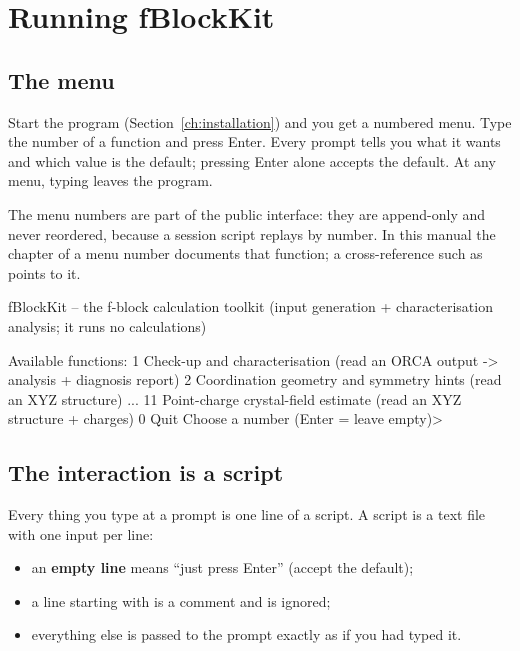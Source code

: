 \chapter{Running fBlockKit}
\label{ch:running}

\section{The menu}

Start the program (Section~\ref{ch:installation}) and you get a numbered menu.
Type the number of a function and press Enter. Every prompt tells you what it
wants and which value is the default; pressing Enter alone accepts the default.
At any menu, typing  leaves the program.

The menu numbers are part of the public interface: they are append-only and
never reordered, because a session script replays by number. In this manual the
chapter of a menu number documents that function; a cross-reference such as
 points to it.

\begin{transcript}[title={The program starts with its menu (excerpt)}]
fBlockKit -- the f-block calculation toolkit (input generation + characterisation analysis; it runs no calculations)

Available functions:
   1  Check-up and characterisation (read an ORCA output -> analysis + diagnosis report)
   2  Coordination geometry and symmetry hints (read an XYZ structure)
   ...
  11  Point-charge crystal-field estimate (read an XYZ structure + charges)
   0  Quit
Choose a number (Enter = leave empty)>
\end{transcript}

\section{The interaction is a script}

Every thing you type at a prompt is one line of a script. A script is a text
file with one input per line:

\begin{itemize}
  \item an \textbf{empty line} means ``just press Enter'' (accept the default);
  \item a line starting with \code{\#} is a comment and is ignored;
  \item everything else is passed to the prompt exactly as if you had typed it.
\end{itemize}

